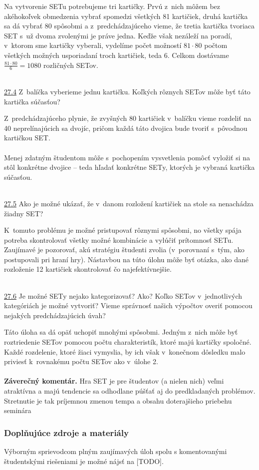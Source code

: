 \rie  Na vytvorenie SETu potrebujeme tri kartičky. Prvú z~nich môžem bez akéhokoľvek obmedzenia vybrať spomedzi všetkých 81 kartičiek, druhá kartička sa dá vybrať 80 spôsobmi a z~predchádzajúceho vieme, že tretia kartička tvoriaca SET s~už dvoma zvolenými je práve jedna. Keďže však nezáleží na poradí, v~ktorom sme kartičky vyberali, vydelíme počet možností $81\cdot80$ počtom všetkých možných usporiadaní troch kartičiek, teda $6$. Celkom dostávame $\frac{81\cdot80}{6}=1080$ rozličných SETov.\\
\\
\begin{tcolorbox}[breakable,notitle,boxrule=0pt,colback=light-gray,colframe=light-gray]\ul{27.4} Z~balíčka vyberieme jednu kartičku. Koľkých rôznych SETov môže byť táto kartička súčasťou?\end{tcolorbox}
\rie  Z~predchádzajúceho plynie, že zvyšných 80 kartičiek v~balíčku vieme rozdeliť na 40 neprelínajúcich sa dvojíc, pričom každá táto dvojica bude tvoriť s~pôvodnou kartičkou SET.\\
\\
\kom Menej zdatným študentom môže s~pochopením vysvetlenia pomôcť vyložiť si na stôl konkrétne dvojice -- teda hľadať konkrétne SETy, ktorých je vybraná kartička súčasťou. \\
\\
\begin{tcolorbox}[breakable,notitle,boxrule=0pt,colback=light-gray,colframe=light-gray]\ul{27.5} Ako je možné ukázať, že v~danom rozložení kartičiek na stole sa nenachádza žiadny SET?\end{tcolorbox}
\rie  K~tomuto problému je možné pristupovať rôznymi spôsobmi, no všetky spája potreba skontrolovať všetky možné kombinácie a vylúčiť prítomnosť SETu. Zaujímavé je pozorovať, akú stratégiu študenti zvolia (v~porovnaní s~tým, ako postupovali pri hraní hry).  Nástavbou na túto úlohu môže byť otázka, ako dané rozloženie 12 kartičiek  skontrolovať čo najefektívnejšie.\\
\\

\begin{tcolorbox}[breakable,notitle,boxrule=0pt,colback=light-gray,colframe=light-gray]\ul{27.6} Je možné SETy nejako kategorizovať? Ako? Koľko SETov v~jednotlivých kategóriách je možné vytvoriť? Vieme správnosť našich výpočtov overiť pomocou nejakých predchádzajúcich úvah?\end{tcolorbox}
\rie Táto úloha sa dá opäť uchopiť mnohými spôsobmi. Jedným z~nich môže byť roztriedenie SETov pomocou počtu charakteristík, ktoré majú kartičky spoločné. Každé rozdelenie, ktoré žiaci vymyslia, by ich však v~konečnom dôsledku malo priviesť k~rovnakému počtu SETov ako v~úlohe 2.\\
\\
\textbf{Záverečný komentár.} Hra SET je pre študentov (a nielen nich) veľmi atraktívna a majú tendencie sa odhodlane púšťať aj do predkladaných problémov. Stretnutie je tak príjemnou zmenou tempa a obsahu doterajšieho priebehu seminára

\subsubsection*{Doplňujúce zdroje a materiály}

Výborným sprievodcom plným zaujímavých úloh spolu s komentovanými študentskými riešeniami je možné nájsť na [TODO].


\newpage

